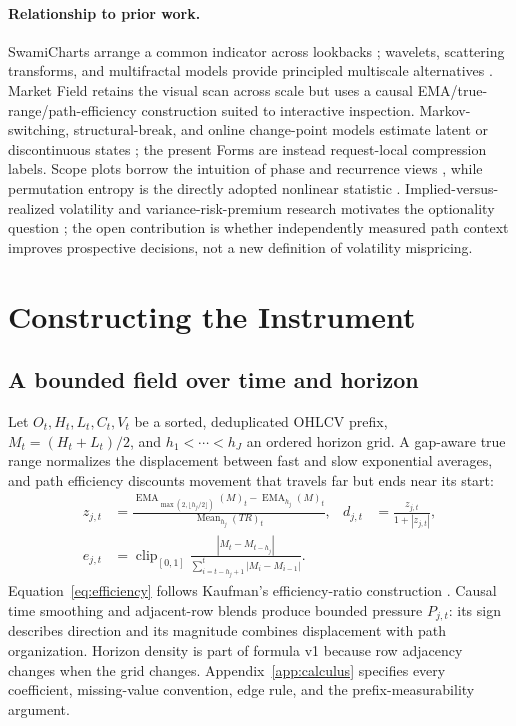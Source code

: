 \documentclass{article}
\newcommand{\method}{Market Field}
\newcommand{\pressure}{P}
\newcommand{\clip}{\operatorname{clip}}
\newcommand{\EMA}{\operatorname{EMA}}
\begin{document}
\paragraph{Relationship to prior work.}
SwamiCharts arrange a common indicator across lookbacks \citep{ehlersway2012introducing,ehlersway2012strategies}; wavelets, scattering transforms, and multifractal models provide principled multiscale alternatives \citep{mallat2012scattering,andenmallat2014deep,bacry2001multifractal}. \method{} retains the visual scan across scale but uses a causal EMA/true-range/path-efficiency construction suited to interactive inspection. Markov-switching, structural-break, and online change-point models estimate latent or discontinuous states \citep{hamilton1989new,baiperron1998structural,adamsmackay2007bocpd}; the present Forms are instead request-local compression labels. Scope plots borrow the intuition of phase and recurrence views \citep{takens1981detecting,eckmann1987recurrence,marwan2007recurrence}, while permutation entropy is the directly adopted nonlinear statistic \citep{bandtpompe2002permutation}. Implied-versus-realized volatility and variance-risk-premium research motivates the optionality question \citep{carrwu2009variance,bollerslev2009variance,goyalsaretto2009options}; the open contribution is whether independently measured path context improves prospective decisions, not a new definition of volatility mispricing.

\section{Constructing the Instrument}
\label{sec:method}

\subsection{A bounded field over time and horizon}

Let $O_t,H_t,L_t,C_t,V_t$ be a sorted, deduplicated OHLCV prefix, $M_t=(H_t+L_t)/2$, and $h_1<\cdots<h_J$ an ordered horizon grid. A gap-aware true range normalizes the displacement between fast and slow exponential averages, and path efficiency discounts movement that travels far but ends near its start:
\begin{align}
z_{j,t} &=
\frac{\EMA_{\max(2,\lfloor h_j/2\rfloor)}(M)_t-\EMA_{h_j}(M)_t}
     {\operatorname{Mean}_{h_j}(TR)_t}, &
d_{j,t}&=\frac{z_{j,t}}{1+|z_{j,t}|}, \label{eq:direction}\\
e_{j,t} &=
\clip_{[0,1]}
\frac{|M_t-M_{t-h_j}|}{\sum_{i=t-h_j+1}^{t}|M_i-M_{i-1}|}. \label{eq:efficiency}
\end{align}
Equation~\ref{eq:efficiency} follows Kaufman's efficiency-ratio construction \citep{kaufman1995smarter}. Causal time smoothing and adjacent-row blends produce bounded pressure $\pressure_{j,t}$: its sign describes direction and its magnitude combines displacement with path organization. Horizon density is part of formula v1 because row adjacency changes when the grid changes. Appendix~\ref{app:calculus} specifies every coefficient, missing-value convention, edge rule, and the prefix-measurability argument.
\end{document}
